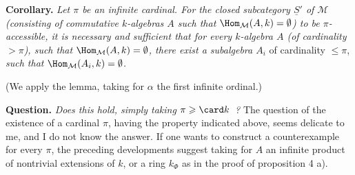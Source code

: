 
\noindent\textbf{Corollary.} \textit{Let $\pi$ be an infinite cardinal. For the closed subcategory $\underline{S}'$ of $\mathcal{M}$ (consisting of commutative $k$-algebras $A$ such that $\Hom_{\mathcal{M}}(A,k)=\emptyset$) to be $\pi$-accessible, it is necessary and sufficient that for every $k$-algebra $A$ (of cardinality ${}>\pi$), such that $\Hom_{\mathcal{M}}(A,k)=\emptyset$, there exist a subalgebra $A_i$} of cardinality $\leqslant\pi$, \textit{such that $\Hom_{\mathcal{M}}(A_i,k)=\emptyset$.} %

\noindent(We apply the lemma, taking for $\alpha$ the first infinite ordinal.)

\noindent\textbf{Question.} \textit{Does this hold, simply taking $\pi\geqslant\card k$~?} The question of the existence of a cardinal $\pi$, having the property indicated above, seems delicate to me, and I do not know the answer. If one wants to construct a counterexample for every $\pi$, the preceding developments suggest taking for $A$ an infinite product of nontrivial extensions of $k$, or a ring $k_{\Phi}$ as in the proof of proposition 4 a).